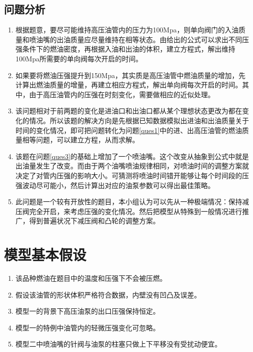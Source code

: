 \documentclass[withoutpreface,bwprint]{cumcmthesis} %
\begin{document}
\subsection{问题分析}
\begin{enumerate}[label=\Roman*.]
	\item 根据题意，要尽可能维持高压油管内的压力为100Mpa，则单向阀门的入油质量和喷油嘴的出油质量应尽量维持在相等状态。由给出的公式可以求出不同压强条件下的燃油密度，再根据入油和出油的体积，建立方程式，解出维持100Mpa所需要的单向阀每次开启的时间。
	\item 如果要将燃油压强提升到150Mpa，其实质是高压油管中燃油质量的增加，先计算出燃油质量的增量，再建立相应方程式，解出单向阀每次开启的时间。其中，由于高压油管内的压强在时刻变化，需要做相应的近似处理。
	\item 该问题相对于前两题的变化是进油口和出油口都从某个理想状态更改为都在变化的情况。所以该题的解决方向是先根据已知数据模拟出进油和出油质量关于时间的变化情况，即可把问题转化为问题\ref{ques1}中的进、出高压油管的燃油质量相等问题，可以建立方程，从而求解。
	\item 该题在问题\ref{ques3}的基础上增加了一个喷油嘴。这个改变从抽象到公式中就是出油量发生了改变。而由于两个油嘴喷油规律相同，对喷油时间的调整方案就决定了对管内压强的影响大小。可猜测将喷油时间错开能够让每个时间段的压强波动尽可能小，然后计算出对应的油泵参数可以得出最佳策略。
	\item 此问题是一个较有开放性的题目，本小组认为可以先从一种极端情况：保持减压阀完全开启，来考虑压强的变化情况。然后把模型从特殊到一般情况进行推广，得到普遍状况下减压阀和凸轮的调整方案。
\end{enumerate}
\section{模型基本假设}
\begin{enumerate}
	\item 该品种燃油在题目中的温度和压强下不会被压燃。
	\item 假设该油管的形状体积严格符合数据，内壁没有凹凸及误差。
	\item 模型一的背景下高压油泵的出口压强保持恒定。
	\item 模型一的特例中油管内的轻微压强变化可忽略。
	\item 模型二中喷油嘴的针阀与油泵的柱塞只做上下平移没有受扰动便宜。
\end{enumerate}
\end{document}
